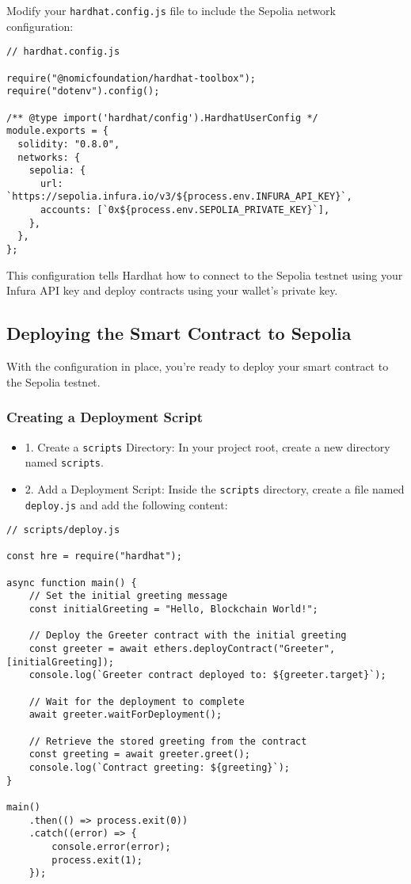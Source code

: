 \documentclass[12pt]{article}
\begin{document}
Modify your \texttt{hardhat.config.js} file to include the Sepolia network configuration:

\begin{verbatim}
// hardhat.config.js

require("@nomicfoundation/hardhat-toolbox");
require("dotenv").config();

/** @type import('hardhat/config').HardhatUserConfig */
module.exports = {
  solidity: "0.8.0",
  networks: {
    sepolia: {
      url: `https://sepolia.infura.io/v3/${process.env.INFURA_API_KEY}`,
      accounts: [`0x${process.env.SEPOLIA_PRIVATE_KEY}`],
    },
  },
};
\end{verbatim}

This configuration tells Hardhat how to connect to the Sepolia testnet using your Infura API key and deploy contracts using your wallet's private key.

\subsection{Deploying the Smart Contract to Sepolia}

With the configuration in place, you're ready to deploy your smart contract to the Sepolia testnet.

\subsubsection{Creating a Deployment Script}

\begin{itemize}
\item 1. Create a \texttt{scripts} Directory: In your project root, create a new directory named \texttt{scripts}.

\item 2. Add a Deployment Script: Inside the \texttt{scripts} directory, create a file named \texttt{deploy.js} and add the following content:
\end{itemize}

\begin{verbatim}
// scripts/deploy.js

const hre = require("hardhat");

async function main() {
    // Set the initial greeting message
    const initialGreeting = "Hello, Blockchain World!";
    
    // Deploy the Greeter contract with the initial greeting
    const greeter = await ethers.deployContract("Greeter", [initialGreeting]);
    console.log(`Greeter contract deployed to: ${greeter.target}`);

    // Wait for the deployment to complete
    await greeter.waitForDeployment();

    // Retrieve the stored greeting from the contract
    const greeting = await greeter.greet();
    console.log(`Contract greeting: ${greeting}`);
}

main()
    .then(() => process.exit(0))
    .catch((error) => {
        console.error(error);
        process.exit(1);
    });
\end{verbatim}
\end{document}
